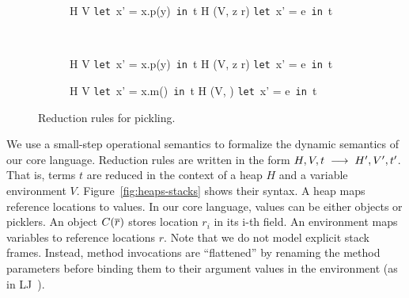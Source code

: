 \begin{figure*}[ht!]
  \centering

  \begin{subfigure}{0.5\textwidth}
    \centering

{ \sreducebreak H V
    {\texttt{let}~x' = x.p(y)~\texttt{in}~t}
    H {(V, z \mapsto r)}
    {\texttt{let}~x' = e~\texttt{in}~t}
}

  \end{subfigure}%
  ~ %
  \begin{subfigure}{0.5\textwidth}
    \centering

{ \sreducebreak H V
    {\texttt{let}~x' = x.p(y)~\texttt{in}~t}
    H {(V, z \mapsto r)}
    {\texttt{let}~x' = e~\texttt{in}~t}
}

  \end{subfigure}
  \begin{subfigure}{0.5\textwidth}
    \centering
    \vspace{0.8em}
{ \sreducebreak H V
    {\texttt{let}~x' = x.m()~\texttt{in}~t}
    H {(V, )}
    {\texttt{let}~x' = e~\texttt{in}~t}
}
  \end{subfigure}
  \caption{Reduction rules for pickling.}
  \label{fig:opsem-rules}
\end{figure*}

We use a small-step operational semantics to formalize the dynamic semantics
of our core language. Reduction rules are written in the form
$H, V, t \;\longrightarrow\; H', V', t'$. That is, terms $t$ are reduced in the context of
a heap $H$ and a variable environment $V$.
Figure~\ref{fig:heaps-stacks} shows their syntax. A
heap maps reference locations to values. In our core language, values can be
either objects or picklers. An object
$C(\overline{r})$ stores location $r_i$ in its i-th field. An environment maps
variables to reference locations $r$. Note that
we do not model explicit stack frames. Instead, method invocations are
``flattened'' by renaming the method parameters before binding them to
their argument values in the environment (as in LJ~\cite{StrnisaSP07}).

